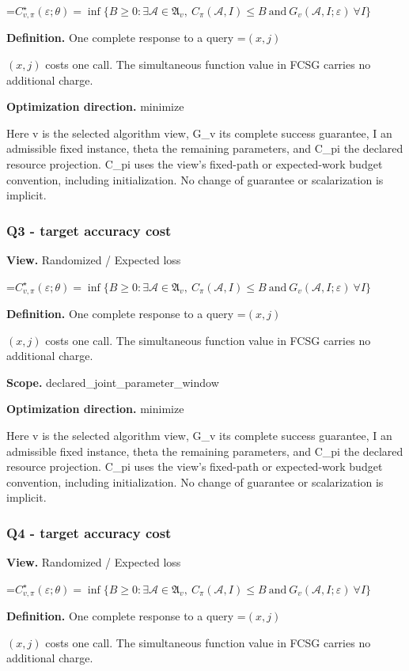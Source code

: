 \documentclass[10pt,a4paper]{article}
\newcommand{\AtlasMath}[1]{\par\begingroup\centering\setbox0=\hbox{$\displaystyle #1$}\ifdim\wd0>1.4\linewidth\typeout{ATLAS WIDE FORMULA: \the\wd0}\fi\ifdim\wd0>\linewidth\resizebox{\linewidth}{!}{\box0}\else\box0\fi\par\endgroup}
\newcommand{\AtlasInlineMath}[1]{\begingroup\setbox0=\hbox{$#1$}\ifdim\wd0>.4\linewidth\endgroup\AtlasMath{#1}\else\endgroup$#1$\fi}
\begin{document}
\AtlasMath{C^\star_{v,\pi}(\varepsilon;\theta)=\inf\{B\ge0:\exists\mathcal A\in\mathfrak A_v,\ C_\pi(\mathcal A,I)\le B\ \text{and}\ G_v(\mathcal A,I;\varepsilon)\ \forall I\}}
\textbf{Definition.} One complete response to a query \AtlasInlineMath{(x,j)} costs one call. The simultaneous function value in FCSG carries no additional charge.

\textbf{Optimization direction.} minimize

Here v is the selected algorithm view, G\_v its complete success guarantee, I an admissible fixed instance, theta the remaining parameters, and C\_pi the declared resource projection. C\_pi uses the view's fixed-path or expected-work budget convention, including initialization. No change of guarantee or scalarization is implicit.

\subsubsection{Q3 - target accuracy cost}
\textbf{View.} Randomized / Expected loss

\AtlasMath{C^\star_{v,\pi}(\varepsilon;\theta)=\inf\{B\ge0:\exists\mathcal A\in\mathfrak A_v,\ C_\pi(\mathcal A,I)\le B\ \text{and}\ G_v(\mathcal A,I;\varepsilon)\ \forall I\}}
\textbf{Definition.} One complete response to a query \AtlasInlineMath{(x,j)} costs one call. The simultaneous function value in FCSG carries no additional charge.

\textbf{Scope.} declared\_joint\_parameter\_window

\textbf{Optimization direction.} minimize

Here v is the selected algorithm view, G\_v its complete success guarantee, I an admissible fixed instance, theta the remaining parameters, and C\_pi the declared resource projection. C\_pi uses the view's fixed-path or expected-work budget convention, including initialization. No change of guarantee or scalarization is implicit.

\subsubsection{Q4 - target accuracy cost}
\textbf{View.} Randomized / Expected loss

\AtlasMath{C^\star_{v,\pi}(\varepsilon;\theta)=\inf\{B\ge0:\exists\mathcal A\in\mathfrak A_v,\ C_\pi(\mathcal A,I)\le B\ \text{and}\ G_v(\mathcal A,I;\varepsilon)\ \forall I\}}
\textbf{Definition.} One complete response to a query \AtlasInlineMath{(x,j)} costs one call. The simultaneous function value in FCSG carries no additional charge.
\end{document}
